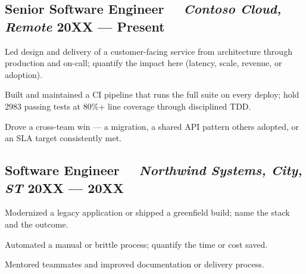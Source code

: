 \subsection{{\textbf{Senior Software Engineer} \textit{\ \ Contoso Cloud, Remote} \hfill 20XX --- Present}}
\begin{zitemize}
\item Led design and delivery of a customer-facing service from architecture through production and on-call; quantify the impact here (latency, scale, revenue, or adoption).
\item Built and maintained a CI pipeline that runs the full suite on every deploy; hold 2983 passing tests at 80\%+ line coverage through disciplined TDD.
\item Drove a cross-team win — a migration, a shared API pattern others adopted, or an SLA target consistently met.
\end{zitemize}
\subsection{{\textbf{Software Engineer} \textit{\ \ Northwind Systems, City, ST} \hfill 20XX --- 20XX}}
\begin{zitemize}
\item Modernized a legacy application or shipped a greenfield build; name the stack and the outcome.
\item Automated a manual or brittle process; quantify the time or cost saved.
\item Mentored teammates and improved documentation or delivery process.
\end{zitemize}
